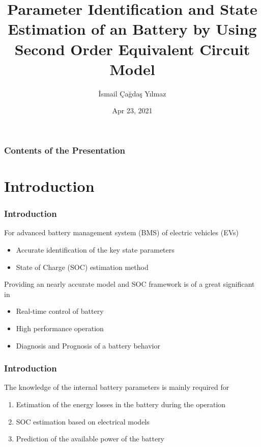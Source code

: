 \documentclass{beamer}
\title[]{Parameter Identification and State Estimation of an Battery by Using Second Order Equivalent Circuit Model}
\institute[]{}
\author{\.{I}smail \c{C}a\u{g}da\c{s} Y{\i}lmaz}
\date[Apr 2021]{Apr 23, 2021}
\begin{document}
{
\frame{\titlepage}
}

{

}

\begin{frame}
	\frametitle{Contents of the Presentation}
	\tableofcontents
\end{frame}

\section{Introduction}
\begin{frame}
	\begin{block}

	\frametitle{Introduction}
		
	For advanced battery management system (BMS) of electric vehicles (EVs)
	\begin{itemize}
		\item Accurate identification of the key state parameters
		\item State of Charge (SOC) estimation method 
	\end{itemize}	
	\vspace{5mm}
	
	Providing an nearly accurate model and SOC framework is of a great significant in 
	\begin{itemize}
		\item Real-time control of battery
		\item High performance operation 
		\item Diagnosis and Prognosis of a battery behavior
	\end{itemize}
	\end{block}	
		
\end{frame}

\begin{frame}
	
	\frametitle{Introduction}
	
	The knowledge of the internal battery parameters is mainly
	required for
	
	\begin{enumerate}
		\item Estimation of the energy losses in the battery during the operation
		
		\vspace{3mm}
		
		\item SOC estimation based on electrical models
		\vspace{2mm}
		
		\item Prediction of the available power of the battery
	\end{enumerate}  

\end{frame}
\end{document}
